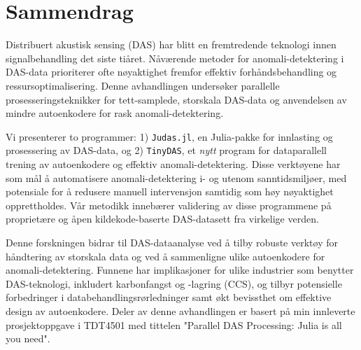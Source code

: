 \chapter*{Sammendrag}

Distribuert akustisk sensing (DAS) har blitt en fremtredende teknologi innen signalbehandling det siste tiåret. Nåværende metoder for anomali-detektering i DAS-data prioriterer ofte nøyaktighet fremfor effektiv forhåndsbehandling og ressursoptimalisering. Denne avhandlingen undersøker parallelle prosesseringsteknikker for tett-samplede, storskala DAS-data og anvendelsen av mindre autoenkodere for rask anomali-detektering.

Vi presenterer to programmer: 1) \texttt{Judas.jl}, en Julia-pakke for innlasting og prosessering av DAS-data, og 2) \texttt{TinyDAS}, et \textit{nytt} program for dataparallell trening av autoenkodere og effektiv anomali-detektering. Disse verktøyene har som mål å automatisere anomali-detektering i- og utenom sanntidsmiljøer, med potensiale for å redusere manuell intervensjon samtidig som høy nøyaktighet opprettholdes. Vår metodikk innebærer validering av disse programmene på proprietære og åpen kildekode-baserte DAS-datasett fra virkelige verden.

Denne forskningen bidrar til DAS-dataanalyse ved å tilby robuste verktøy for håndtering av storskala data og ved å sammenligne ulike autoenkodere for anomali-detektering. Funnene har implikasjoner for ulike industrier som benytter DAS-teknologi, inkludert karbonfangst og -lagring (CCS), og tilbyr potensielle forbedringer i databehandlingsrørledninger samt økt bevissthet om effektive design av autoenkodere. Deler av denne avhandlingen er basert på min innleverte prosjektoppgave i TDT4501 med tittelen "Parallel DAS Processing: Julia is all you need".

